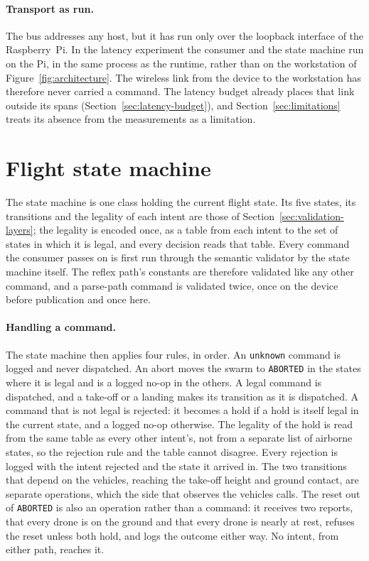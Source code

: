 \paragraph{Transport as run.} The bus addresses any host, but it has run only over the loopback
interface of the Raspberry~Pi. In the latency experiment the consumer and the state machine run on
the Pi, in the same process as the runtime, rather than on the workstation of
Figure~\ref{fig:architecture}. The wireless link from the device to the workstation has therefore
never carried a command. The latency budget already places that link outside its spans
(Section~\ref{sec:latency-budget}), and Section~\ref{sec:limitations} treats its absence from the
measurements as a limitation.

\section{Flight state machine}
\label{sec:state-machine}
The state machine is one class holding the current flight state. Its five states, its transitions
and the legality of each intent are those of Section~\ref{sec:validation-layers}; the legality is
encoded once, as a table from each intent to the set of states in which it is legal, and every
decision reads that table. Every command the consumer passes on is first run through the semantic
validator by the state machine itself. The reflex path's constants are therefore validated like any
other command, and a parse-path command is validated twice, once on the device before publication
and once here.

\paragraph{Handling a command.} The state machine then applies four rules, in order. An
\texttt{unknown} command is logged and never dispatched. An abort moves the swarm to
\texttt{ABORTED} in the states where it is legal and is a logged no-op in the others. A legal
command is dispatched, and a take-off or a landing makes its transition as it is dispatched. A
command that is not legal is rejected: it becomes a hold if a hold is itself legal in the current
state, and a logged no-op otherwise. The legality of the hold is read from the same table as every
other intent's, not from a separate list of airborne states, so the rejection rule and the table
cannot disagree. Every rejection is logged with the intent rejected and the state it arrived in. The
two transitions that depend on the vehicles, reaching the take-off height and ground contact, are
separate operations, which the side that observes the vehicles calls. The reset out of
\texttt{ABORTED} is also an operation rather than a command: it receives two reports, that every
drone is on the ground and that every drone is nearly at rest, refuses the reset unless both hold,
and logs the outcome either way. No intent, from either path, reaches it.


